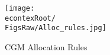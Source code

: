 \begin{figure}[]
	\centerline{\texttt{[image: \\econtexRoot/\\FigsRaw/Alloc\_rules.jpg]}}
	\caption{CGM Allocation Rules}
	\label{fig:AllocRules}
\end{figure}
